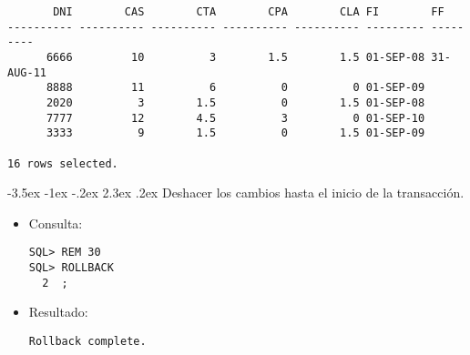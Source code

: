 \documentclass[11pt]{report}
\makeatletter
\renewcommand\chapter{\@startsection{chapter}{0}{\z@}%
    {-3.5ex \@plus -1ex \@minus -.2ex}%
    {2.3ex \@plus.2ex}%
    {\normalfont\Large\bfseries}}
\makeatother
\begin{document}
\begin{itemize}
\begin{verbatim}
       DNI        CAS        CTA        CPA        CLA FI        FF                                                                                                                                     
---------- ---------- ---------- ---------- ---------- --------- ---------                                                                                                                              
      6666         10          3        1.5        1.5 01-SEP-08 31-AUG-11                                                                                                                              
      8888         11          6          0          0 01-SEP-09                                                                                                                                        
      2020          3        1.5          0        1.5 01-SEP-08                                                                                                                                        
      7777         12        4.5          3          0 01-SEP-10                                                                                                                                        
      3333          9        1.5          0        1.5 01-SEP-09                                                                                                                                        

16 rows selected.
  \end{verbatim}
\end{itemize}

\chapter{Deshacer los cambios hasta el inicio de la transacción.}
\begin{itemize}
  \item Consulta:
  \begin{verbatim}
SQL> REM 30
SQL> ROLLBACK
  2  ;
  \end{verbatim}
  \item{Resultado:}
  \begin{verbatim}
Rollback complete.
  \end{verbatim}
\end{itemize}

\end{document}
